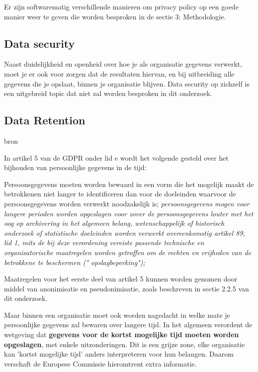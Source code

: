 Er zijn softwarematig verschillende manieren om privacy policy op een goede manier weer te geven die worden besproken in de sectie 3: Methodologie. 

\subsection{Data security}
Naast duidelijkheid en openheid over hoe je als organisatie gegevens verwerkt, moet je er ook voor zorgen dat de resultaten hiervan, en bij uitbreiding alle gegevens die je opslaat, binnen je organisatie blijven. Data security op zichzelf is een uitgebreid topic dat niet zal worden besproken in dit onderzoek. 

\subsection{Data Retention}
bron %

In artikel 5 van de GDPR onder lid e wordt het volgende gesteld over het bijhouden van persoonlijke gegevens in de tijd:

Persoonsgegevens moeten worden bewaard in een vorm die het mogelijk maakt de betrokkenen niet langer te identificeren dan voor de doeleinden waarvoor de persoonsgegevens worden verwerkt noodzakelijk is; \textit{persoonsgegevens mogen voor langere perioden worden opgeslagen voor zover de persoonsgegevens louter met het oog op archivering in het algemeen belang, wetenschappelijk of historisch onderzoek of statistische doeleinden worden verwerkt overeenkomstig artikel 89, lid 1, mits de bij deze verordening vereiste passende technische en organisatorische maatregelen worden getroffen om de rechten en vrijheden van de betrokkene te beschermen (" opslagbeperking");}

Maatregelen voor het eerste deel van artikel 5 kunnen worden genomen door middel van anonimisatie en pseudonimisatie, zoals beschreven in sectie 2.2.5 van dit onderzoek. 

Maar binnen een organisatie moet ook worden nagedacht in welke mate je persoonlijke gegevens zal bewaren over langere tijd. In het algemeen verordent de wetgeving dat \textbf{gegevens voor de kortst mogelijke tijd moeten worden opgeslagen}, met enkele uitzonderingen. Dit is een grijze zone, elke organisatie kan 'kortst mogelijke tijd' anders interpreteren voor hun belangen. Daarom verschaft de Europese Commissie hieromtrent extra informatie. 

